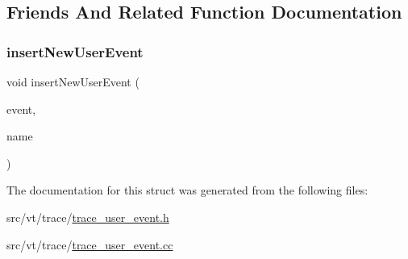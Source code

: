 \subsection{Friends And Related Function Documentation}
\mbox{\label{structvt_1_1trace_1_1_user_event_registry_a17caa1eeb27fd6a4af8786a7f0679d77}} 
\subsubsection{\texorpdfstring{insert\+New\+User\+Event}{insertNewUserEvent}}
{\footnotesize\ttfamily void insert\+New\+User\+Event (\begin{DoxyParamCaption}\item[{\hyperlink{namespacevt_1_1trace_a5908920d051c144c89f17c69ed262350}{User\+Event\+I\+D\+Type}}]{event,  }\item[{std\+::string const \&}]{name }\end{DoxyParamCaption})\hspace{0.3cm}{\ttfamily [friend]}}



The documentation for this struct was generated from the following files\+:\begin{DoxyCompactItemize}
\item 
src/vt/trace/\hyperlink{trace__user__event_8h}{trace\+\_\+user\+\_\+event.\+h}\item 
src/vt/trace/\hyperlink{trace__user__event_8cc}{trace\+\_\+user\+\_\+event.\+cc}\end{DoxyCompactItemize}
